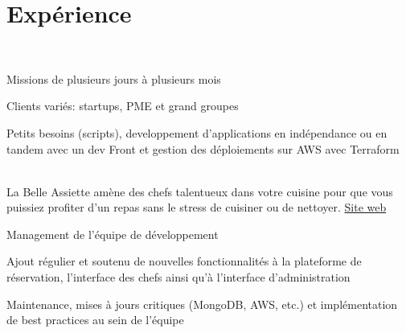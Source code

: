 \documentclass[
  french,
  a4paper
]{resume-openfont}
\begin{document}
\hfill%
\begin{minipage}[t]{0.66\textwidth}


\section{Expérience}

%
%
\\
\vspace{0.5\topsep}
\begin{tightemize}
\item Missions de plusieurs jours à plusieurs mois
\item Clients variés: startups, PME et grand groupes
\item Petits besoins (scripts), developpement d'applications en indépendance ou en tandem avec un dev Front et gestion des déploiements sur AWS avec Terraform
\end{tightemize}
\sectionsep

%
%
\\
La Belle Assiette amène des chefs talentueux dans votre cuisine pour que vous puissiez profiter d'un repas sans le stress de cuisiner ou de nettoyer. \href{https://labelleassiette.fr}{Site web}
\vspace{\topsep}
\begin{tightemize}
\item Management de l'équipe de développement
\item Ajout régulier et soutenu de nouvelles fonctionnalités à la plateforme de réservation, l'interface des chefs ainsi qu'à l'interface d'administration
\item Maintenance, mises à jours critiques (MongoDB, AWS, etc.) et implémentation de best practices au sein de l'équipe
\end{tightemize}
\sectionsep


\end{minipage}
\end{document}
